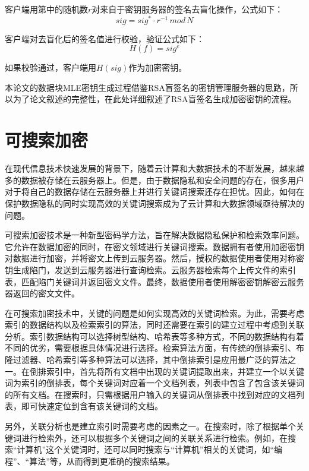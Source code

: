 \documentclass[promaster]{thesis-uestc}
\begin{document}
客户端用第中的随机数$r$对来自于密钥服务器的签名去盲化操作，公式如下：
\begin{equation}
    sig = sig^* \cdot r^{-1}\,mod\,N
\end{equation}

客户端对去盲化后的签名值进行校验，验证公式如下：
\begin{equation}
    H(f) = sig^e
\end{equation}

 如果校验通过，客户端用$H(sig)$作为加密密钥。

本论文的数据块MLE密钥生成过程借鉴RSA盲签名的密钥管理服务器的思路，所以为了论文叙述的完整性，在此处详细叙述了RSA盲签名生成加密密钥的流程。

\section{可搜索加密}
在现代信息技术快速发展的背景下，随着云计算和大数据技术的不断发展，越来越多的数据被存储在云服务器上。但是，由于数据隐私和安全问题的存在，很多用户对于将自己的数据存储在云服务器上并进行关键词搜索还存在担忧。因此，如何在保护数据隐私的同时实现高效的关键词搜索成为了云计算和大数据领域亟待解决的问题。

可搜索加密技术是一种新型密码学方法，旨在解决数据隐私保护和检索效率问题。它允许在数据加密的同时，在密文领域进行关键词搜索。数据拥有者使用加密密钥对数据进行加密，并将密文上传到云服务器。然后，授权的数据使用者使用对称密钥生成陷门，发送到云服务器进行查询检索。云服务器检索每个上传文件的索引表，匹配陷门关键词并返回密文文件。最终，数据使用者使用解密密钥解密云服务器返回的密文文件。

在可搜索加密技术中，关键的问题是如何实现高效的关键词检索。为此，需要考虑索引的数据结构以及检索索引的算法，同时还需要在索引的建立过程中考虑到关联分析。索引数据结构可以选择树型结构、哈希表等多种方式，不同的数据结构有着不同的优劣，需要根据具体情况进行选择。检索算法方面，有传统的倒排索引、布隆过滤器、哈希索引等多种算法可以选择，其中倒排索引是应用最广泛的算法之一。在倒排索引中，首先将所有文档中出现的关键词提取出来，并建立一个以关键词为索引的倒排表，每个关键词对应着一个文档列表，列表中包含了包含该关键词的所有文档。在搜索时，只需根据用户输入的关键词从倒排表中找到对应的文档列表，即可快速定位到含有该关键词的文档。

另外，关联分析也是建立索引时需要考虑的因素之一。在搜索时，除了根据单个关键词进行检索外，还可以根据多个关键词之间的关联关系进行检索。例如，在搜索“计算机”这个关键词时，还可以同时搜索与“计算机”相关的关键词，如“编程”、“算法”等，从而得到更准确的搜索结果。
\end{document}
